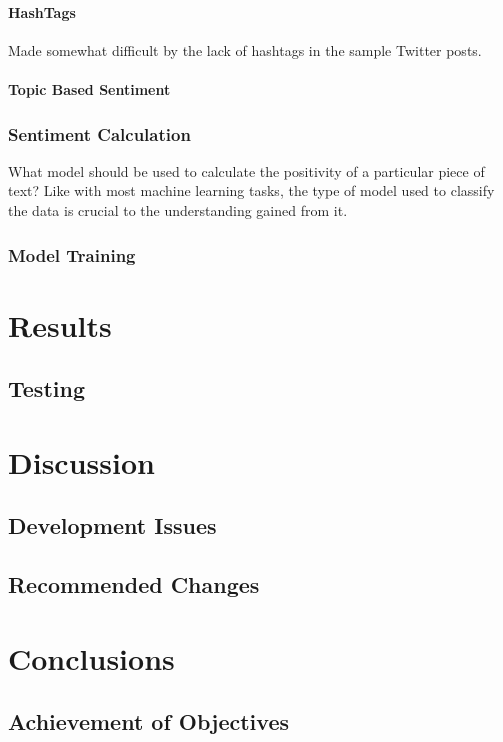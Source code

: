 \documentclass{acm_proc_article-sp}
\begin{document}
			\paragraph{HashTags}
			Made somewhat difficult by the lack of hashtags in the sample Twitter posts.
			\paragraph{Topic Based Sentiment}
			
		\subsubsection{Sentiment Calculation}
		What model should be used to calculate the positivity of a particular piece of text? Like with most machine learning tasks, the type of model used to classify the data is crucial to the understanding gained from it. 
		\subsubsection{Model Training}
\section{Results}
	\subsection{Testing}
\section{Discussion}
	\subsection{Development Issues}
	\subsection{Recommended Changes}
\section{Conclusions}
	\subsection{Achievement of Objectives}
\end{document}
